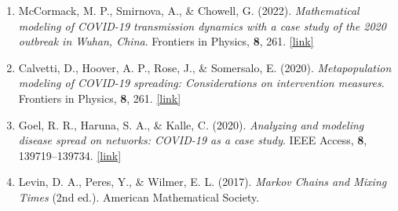\documentclass[a4paper]{article}
\begin{document}
\begin{enumerate}
		\item McCormack, M. P., Smirnova, A., \& Chowell, G. (2022). \textit{Mathematical modeling of COVID-19 transmission dynamics with a case study of the 2020 outbreak in Wuhan, China}. Frontiers in Physics, \textbf{8}, 261. \href{https://pmc.ncbi.nlm.nih.gov/articles/PMC9698251}{[link]}
		
		\item Calvetti, D., Hoover, A. P., Rose, J., \& Somersalo, E. (2020). \textit{Metapopulation modeling of COVID-19 spreading: Considerations on intervention measures}. Frontiers in Physics, \textbf{8}, 261. \href{https://www.frontiersin.org/journals/physics/articles/10.3389/fphy.2020.00261/full}{[link]}
		
		\item Goel, R. R., Haruna, S. A., \& Kalle, C. (2020). \textit{Analyzing and modeling disease spread on networks: COVID-19 as a case study}. IEEE Access, \textbf{8}, 139719–139734. \href{https://ieeexplore.ieee.org/document/9381457}{[link]}
		
		\item Levin, D. A., Peres, Y., \& Wilmer, E. L. (2017). \textit{Markov Chains and Mixing Times} (2nd ed.). American Mathematical Society.
		
	\end{enumerate}
	
	
	
	
	
	\newpage
\end{document}
